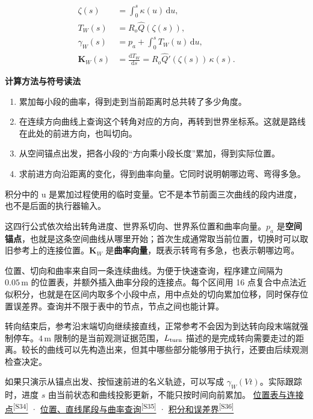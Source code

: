 \documentclass[12pt,a4paper]{article}
\numberwithin{equation}{topic}
\newcommand{\sourceref}[2]{\hyperlink{source-#1}{#2\textsuperscript{[#1]}}}
\begin{document}
\begin{equation}
\label{eq:spatial}
\begin{aligned}
\zeta(s)&=\int_0^s \kappa(u)\,\mathrm du,\\
T_W(s)&=R_o\widehat Q(\zeta(s)),\\
\gamma_W(s)&=p_a+\int_0^s T_W(u)\,\mathrm du,\\
\mathbf K_W(s)&=\frac{\mathrm dT_W}{\mathrm ds}
=R_o\widehat Q'(\zeta(s))\,\kappa(s).
\end{aligned}
\end{equation}

\noindent\textbf{计算方法与符号读法}\par\nobreak
\begin{enumerate}
\item 累加每小段的曲率，得到走到当前距离时总共转了多少角度。
\item 在连续方向曲线上查询这个转角对应的方向，再转到世界坐标系。这就是路线在此处的前进方向，也叫切向。
\item 从空间锚点出发，把各小段的“方向乘小段长度”累加，得到实际位置。
\item 求前进方向沿距离的变化，得到曲率向量。它同时说明朝哪边弯、弯得多急。
\end{enumerate}
积分中的 u 是累加过程使用的临时变量。它不是本节前面三次曲线的段内进度，也不是后面的执行器输入。


这四行公式依次给出转角进度、世界系切向、世界系位置和曲率向量。\(p_a\) 是\textbf{空间锚点}，也就是这条空间曲线从哪里开始；首次生成通常取当前位置，切换时可以取旧参考上的连接位置。\(\mathbf K_W\) 是\textbf{曲率向量}，既表示转弯有多急，也表示朝哪边弯。

位置、切向和曲率来自同一条连续曲线。为便于快速查询，程序建立间隔为 \(0.05\,\mathrm m\) 的位置表，并额外插入曲率分段的连接点。每个区间用 16 点复合中点法近似积分，也就是在区间内取多个小段中点，用中点处的切向累加位移，同时保存位置误差界。查询并不限于表中的节点，节点之间也能计算。

转向结束后，参考沿末端切向继续接直线，正常参考不会因为到达转向段末端就强制停车。\(4\,\mathrm m\) 限制的是当前观测证据范围，\(L_{\rm turn}\) 描述的是完成转向需要走过的距离。较长的曲线可以先构造出来，但其中哪些部分能够用于执行，还要由后续观测检查决定。

如果只演示从锚点出发、按恒速前进的名义轨迹，可以写成 \(\gamma_W(Vt)\)。实际跟踪时，进度 \(s\) 由当前状态和曲线投影更新，不能只按时间向前累加。 \sourceref{S34}{位置表与连接点} · \sourceref{S35}{位置、直线尾段与曲率查询} · \sourceref{S36}{积分和误差界}
\end{document}
